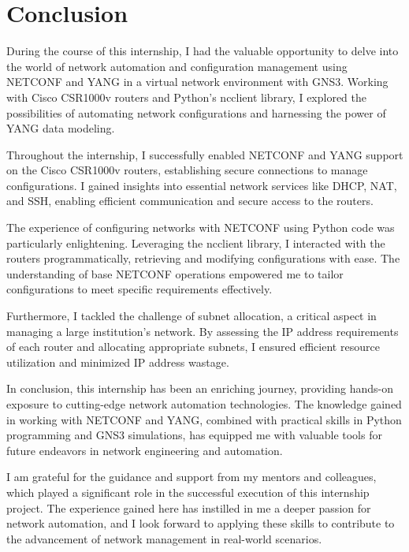 \chapter*{Conclusion}


During the course of this internship, I had the valuable opportunity to delve into the world of network automation and configuration management using NETCONF and YANG in a virtual network environment with GNS3. Working with Cisco CSR1000v routers and Python's ncclient library, I explored the possibilities of automating network configurations and harnessing the power of YANG data modeling.

Throughout the internship, I successfully enabled NETCONF and YANG support on the Cisco CSR1000v routers, establishing secure connections to manage configurations. I gained insights into essential network services like DHCP, NAT, and SSH, enabling efficient communication and secure access to the routers.

The experience of configuring networks with NETCONF using Python code was particularly enlightening. Leveraging the ncclient library, I interacted with the routers programmatically, retrieving and modifying configurations with ease. The understanding of base NETCONF operations empowered me to tailor configurations to meet specific requirements effectively.

Furthermore, I tackled the challenge of subnet allocation, a critical aspect in managing a large institution's network. By assessing the IP address requirements of each router and allocating appropriate subnets, I ensured efficient resource utilization and minimized IP address wastage.

In conclusion, this internship has been an enriching journey, providing hands-on exposure to cutting-edge network automation technologies. The knowledge gained in working with NETCONF and YANG, combined with practical skills in Python programming and GNS3 simulations, has equipped me with valuable tools for future endeavors in network engineering and automation.

I am grateful for the guidance and support from my mentors and colleagues, which played a significant role in the successful execution of this internship project. The experience gained here has instilled in me a deeper passion for network automation, and I look forward to applying these skills to contribute to the advancement of network management in real-world scenarios.